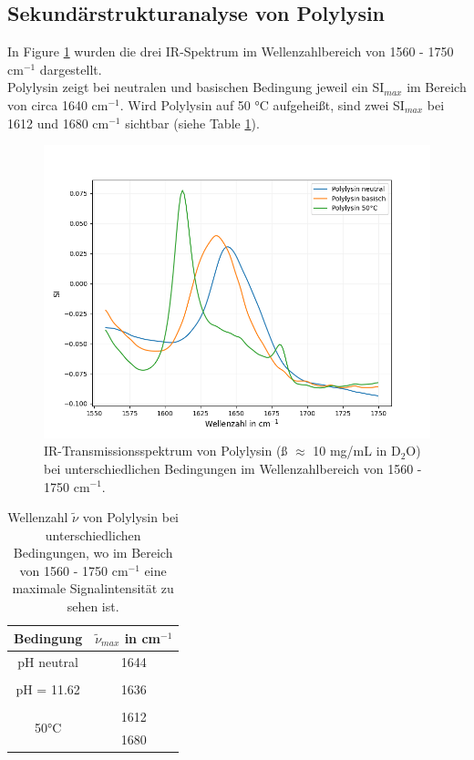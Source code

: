 \documentclass[10pt,a4paper]{article}
\begin{document}
		\subsection{Sekundärstrukturanalyse von Polylysin}
		
			In Figure \ref{fig:polylysin_IR_Spektrum} wurden die drei IR-Spektrum im Wellenzahlbereich von 1560 - 1750 cm$^{-1}$ dargestellt.\\
			Polylysin zeigt bei neutralen und basischen Bedingung jeweil ein SI$_{max}$ im Bereich von circa 1640 cm$^{-1}$. Wird Polylysin auf 50 °C aufgeheißt, sind zwei SI$_{max}$ bei 1612 und 1680 cm$^{-1}$ sichtbar (siehe Table \ref{tab:Polylysin_SI}).
				
			\begin{figure}[H]
				\centering
				\includegraphics[scale=0.55]{Polylysin.png}
				\caption{IR-Transmissionsspektrum von Polylysin (ß $\approx$ 10 mg/mL in D$_2$O) bei unterschiedlichen Bedingungen im Wellenzahlbereich von 1560 - 1750 cm$^{-1}$.}
				\label{fig:polylysin_IR_Spektrum}
			\end{figure}
			
			\begin{table}[H]
				\centering
				\caption{Wellenzahl $\tilde{\nu}$ von Polylysin bei unterschiedlichen Bedingungen, wo im Bereich von 1560 - 1750 cm$^{-1}$ eine maximale Signalintensität zu sehen ist.}
				\label{tab:Polylysin_SI}
				\begin{tabular}{cc}
					\toprule
					Bedingung & $\tilde{\nu}_{max}$ in cm$^{-1}$\\
					\midrule
					pH neutral & 1644\\
					&\\
					pH = 11.62 & 1636\\
					&\\
					\multirow{2}{*}{50°C } & 1612\\
					& 1680\\
					\bottomrule
				\end{tabular}
			\end{table}	
\end{document}
